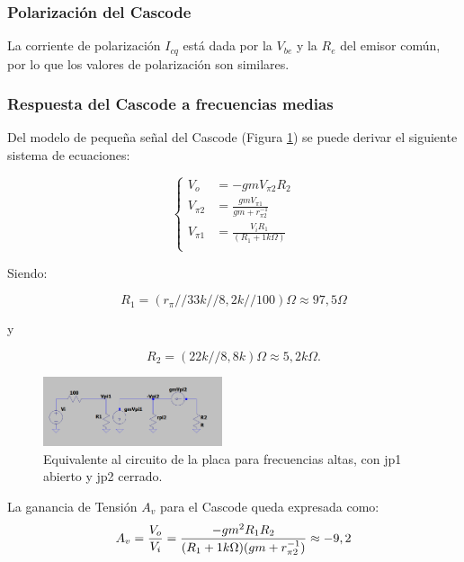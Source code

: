 \documentclass[letterpaper, 10 pt, conference]{ieeeconf}  %
\begin{document}
\subsubsection{Polarización del Cascode}

La corriente de polarización $I_{cq}$ está dada por la $V_{be}$ y la $R_e$ del emisor común, por lo que los valores de polarización son similares.

\subsubsection{Respuesta del Cascode a frecuencias medias}

Del modelo de pequeña señal del Cascode (Figura \ref{fig:cascode_freq_medias}) se puede derivar el siguiente sistema de ecuaciones:

\begin{equation}
\left\{
\begin{aligned}
V_o &= -gmV_{\pi 2}R_2\\ 
V_{\pi2} &= \frac{gmV_{\pi1}}{gm+r_{\pi2}^{-1}} \\
V_{\pi1} &= \frac{V_iR_1}{(R_1 + 1k\Omega)}\\
\end{aligned}
\right.
\label{aprox_polos}
\end{equation}

Siendo:

\begin{equation}
    R_1 = (r_{\pi} // 33k // 8,2k // 100) \Omega \approx 97,5\Omega
\end{equation}

y

\begin{equation} 
    R_2 = (22k // 8,8k) \Omega \approx 5,2k\Omega.      
\end{equation}

\begin{figure}[H]
  \centering
  \includegraphics[width=0.47\textwidth]{imagenes/freq medias cascode.png}
  \caption{Equivalente al circuito de la placa para frecuencias altas, con jp1 abierto y jp2 cerrado.}
  \label{fig:cascode_freq_medias}
\end{figure}

La ganancia de Tensión $A_v$ para el Cascode queda expresada como:\\
\begin{equation}
A_v = \frac{V_o}{V_i} = \frac{-gm^2R_1R_2}{(R_1 + 1k\Omega)(gm+r_{\pi2}^{-1})} \approx -9,2\\
\end{equation}
\end{document}
